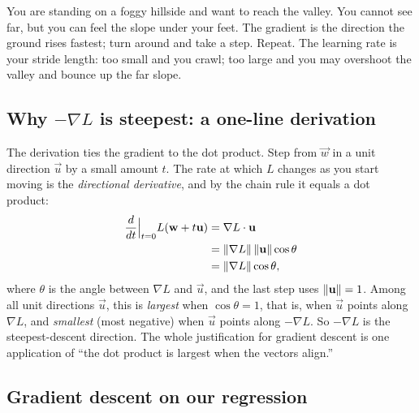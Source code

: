 \begin{intuitionbox}
You are standing on a foggy hillside and want to reach the valley. You cannot see far,
but you can feel the slope under your feet. The gradient is the direction the ground rises
fastest; turn around and take a step. Repeat. The learning rate is your stride length:
too small and you crawl; too large and you may overshoot the valley and bounce up the far
slope.
\end{intuitionbox}

\subsection{Why $-\nabla L$ is steepest: a one-line derivation}

The derivation ties the gradient to the dot product. Step from $\vec{w}$ in a unit
direction $\vec{u}$ by a small amount $t$. The rate at which $L$ changes as you start
moving is the \emph{directional derivative}, and by the chain rule it equals a dot product:
\begin{align*}
\frac{d}{dt}\Big|_{t=0} L(\mathbf{w}+t\mathbf{u}) &= \nabla L \cdot \mathbf{u} \\
&= \lVert\nabla L\rVert\,\lVert\mathbf{u}\rVert\cos\theta \\
&= \lVert\nabla L\rVert\cos\theta,
\end{align*}
where $\theta$ is the angle between $\nabla L$ and $\vec{u}$, and the last step uses
$\lVert\mathbf{u}\rVert=1$. Among all unit directions $\vec{u}$, this is
\emph{largest} when $\cos\theta=1$, that is, when $\vec{u}$ points along $\nabla L$, and
\emph{smallest} (most negative) when $\vec{u}$ points along $-\nabla L$. So $-\nabla L$ is
the steepest-descent direction. The whole justification for gradient descent is one
application of ``the dot product is largest when the vectors align.''

\subsection{Gradient descent on our regression}

